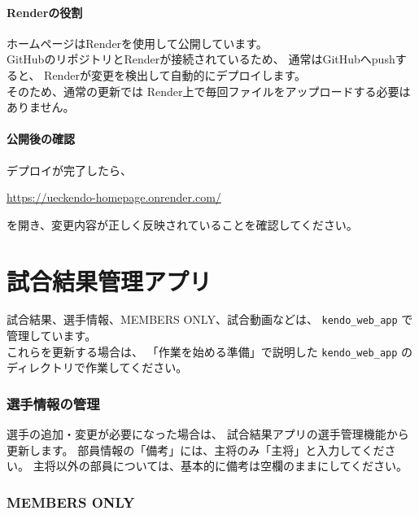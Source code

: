 \documentclass[a4paper,11pt]{ltjsarticle}
\begin{document}
\subsection{Renderの役割}

ホームページはRenderを使用して公開しています。\\
GitHubのリポジトリとRenderが接続されているため、
通常はGitHubへpushすると、
Renderが変更を検出して自動的にデプロイします。\\
そのため、通常の更新では
Render上で毎回ファイルをアップロードする必要はありません。


\subsection{公開後の確認}

デプロイが完了したら、

\begin{center}
\url{https://ueckendo-homepage.onrender.com/}
\end{center}

を開き、変更内容が正しく反映されていることを確認してください。


\part{試合結果管理アプリ}

試合結果、選手情報、MEMBERS ONLY、試合動画などは、
\texttt{kendo\_web\_app} で管理しています。\\
これらを更新する場合は、
「作業を始める準備」で説明した
\texttt{kendo\_web\_app} のディレクトリで作業してください。


\section{選手情報の管理}

選手の追加・変更が必要になった場合は、
試合結果アプリの選手管理機能から更新します。
部員情報の「備考」には、主将のみ「主将」と入力してください。 
主将以外の部員については、基本的に備考は空欄のままにしてください。

\section{MEMBERS ONLY}
\end{document}
